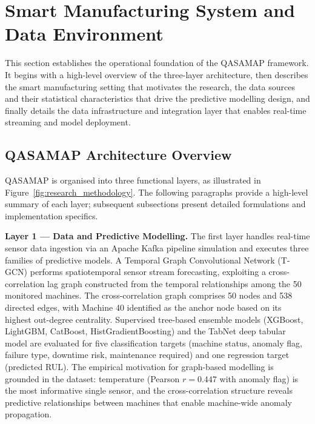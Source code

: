 \section{Smart Manufacturing System and Data Environment}

This section establishes the operational foundation of the QASAMAP framework. It begins with a high-level overview of the three-layer architecture, then describes the smart manufacturing setting that motivates the research, the data sources and their statistical characteristics that drive the predictive modelling design, and finally details the data infrastructure and integration layer that enables real-time streaming and model deployment.

\subsection{QASAMAP Architecture Overview}

QASAMAP is organised into three functional layers, as illustrated in Figure~\ref{fig:research_methodology}. The following paragraphs provide a high-level summary of each layer; subsequent subsections present detailed formulations and implementation specifics.

\textbf{Layer 1 --- Data and Predictive Modelling.} The first layer handles real-time sensor data ingestion via an Apache Kafka pipeline simulation and executes three families of predictive models. A Temporal Graph Convolutional Network (T-GCN) performs spatiotemporal sensor stream forecasting, exploiting a cross-correlation lag graph constructed from the temporal relationships among the 50 monitored machines. The cross-correlation graph comprises 50 nodes and 538 directed edges, with Machine 40 identified as the anchor node based on its highest out-degree centrality. Supervised tree-based ensemble models (XGBoost, LightGBM, CatBoost, HistGradientBoosting) and the TabNet deep tabular model are evaluated for five classification targets (machine status, anomaly flag, failure type, downtime risk, maintenance required) and one regression target (predicted RUL). The empirical motivation for graph-based modelling is grounded in the dataset: temperature (Pearson $r = 0.447$ with anomaly flag) is the most informative single sensor, and the cross-correlation structure reveals predictive relationships between machines that enable machine-wide anomaly propagation.

